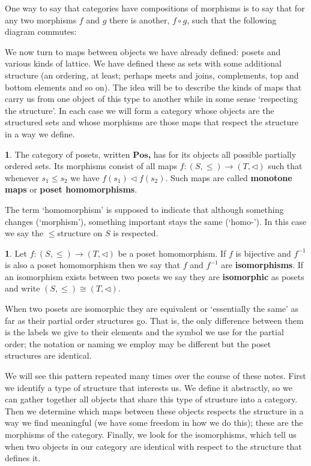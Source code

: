 \documentclass[oneside,english]{amsbook}
\numberwithin{section}{chapter}
\theoremstyle{plain}
\theoremstyle{definition}
\newtheorem{defn}[thm]{\protect\definitionname}
\providecommand{\definitionname}{Definition}
\begin{document}
One way to say that categories have compositions of morphisms is to say that for any two morphisms $f$ and $g$ there is another, $f\circ g$, such that the following diagram commutes:

We now turn to maps between objects we have already defined: posets and various kinds of lattice. We have defined these as sets with some additional structure (an ordering, at least; perhaps meets and joins, complements, top and bottom elements and so on). The idea will be to describe the kinds of maps that carry us from one object of this type to another while in some sense `respecting the structure'. In each case we will form a category whose objects are the structured sets and whose morphisms are those maps that respect the structure in a way we define. 

\begin{defn} 
	The category of posets, written \textbf{$\mathbf{Pos}$, }has for its objects all possible partially ordered sets. Its morphisms consist of all maps $f:(S,\le)\to(T,\lhd)$ such that whenever $s_{1}\le s_{2}$ we have $f(s_{1})\lhd f(s_{2})$. Such maps are called \textbf{monotone maps }or \textbf{poset homomorphisms}. 
\end{defn} 

The term `homomorphism' is supposed to indicate that although something changes (`morphism'), something important stays the same (`homo-'). In this case we say the $\le$structure on $S$ is respected. 

\begin{defn} 
	Let $f:(S,\le)\to(T,\lhd)$ be a poset homomorphism. If $f$ is bijective and $f^{-1}$ is also a poset homomorphism then we say that $f$ and $f^{-1}$ are \textbf{isomorphisms}. If an isomorphism exists between two posets we say they are \textbf{isomorphic} as posets and write $(S,\le)\cong(T,\lhd)$. 
\end{defn} 

When two posets are isomorphic they are equivalent or `essentially the same' as far as their partial order structures go. That is, the only difference between them is the labels we give to their elements and the symbol we use for the partial order; the notation or naming we employ may be different but the poset structures are identical.

We will see this pattern repeated many times over the course of these notes. First we identify a type of structure that interests us. We define it abstractly, so we can gather together all objects that share this type of strusture into a category. Then we determine which maps between these objects respects the structure in a way we find meaningful (we have some freedom in how we do this); these are the morphisms of the category. Finally, we look for the isomorphisms, which tell us when two objects in our category are identical with respect to the structure that defines it. 
\end{document}
